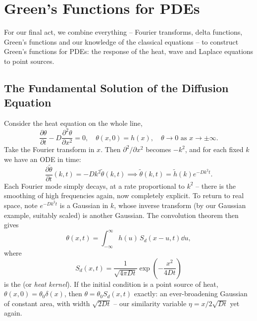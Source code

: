 \section{Green's Functions for PDEs}

For our final act, we combine everything -- Fourier transforms, delta functions, Green's functions and our knowledge of the classical equations -- to construct Green's functions for PDEs: the response of the heat, wave and Laplace equations to point sources.

\subsection{The Fundamental Solution of the Diffusion Equation}

Consider the heat equation on the whole line,
$$
\frac{\partial \theta}{\partial t} - D \frac{\partial^2 \theta}{\partial x^2} = 0, \quad \theta(x, 0) = h(x), \quad \theta \to 0 \text{ as } x \to \pm \infty.
$$
Take the Fourier transform in $x$. Then $\partial^2/\partial x^2$ becomes $-k^2$, and for each fixed $k$ we have an ODE in time:
$$
\frac{\partial \tilde{\theta}}{\partial t}(k, t) = -Dk^2 \tilde{\theta}(k, t) \implies \tilde{\theta}(k, t) = \tilde{h}(k) e^{-Dk^2 t}.
$$
Each Fourier mode simply decays, at a rate proportional to $k^2$ -- there is the smoothing of high frequencies again, now completely explicit. To return to real space, note $e^{-Dk^2t}$ is a Gaussian in $k$, whose inverse transform (by our Gaussian example, suitably scaled) is another Gaussian. The convolution theorem then gives
$$
\theta(x, t) = \int_{-\infty}^{\infty} h(u)\, S_d(x - u, t) \dd u,
$$
where
$$
S_d(x, t) = \frac{1}{\sqrt{4 \pi D t}} \exp \left(-\frac{x^2}{4Dt}\right)
$$
is the  (or \emph{heat kernel}). If the initial condition is a point source of heat, $\theta(x, 0) = \theta_0 \delta(x)$, then $\theta = \theta_0 S_d(x, t)$ exactly: an ever-broadening Gaussian of constant area, with width $\sqrt{2Dt}$ -- our similarity variable $\eta = x/2\sqrt{Dt}$ yet again.

\begin{center}
\end{center}

